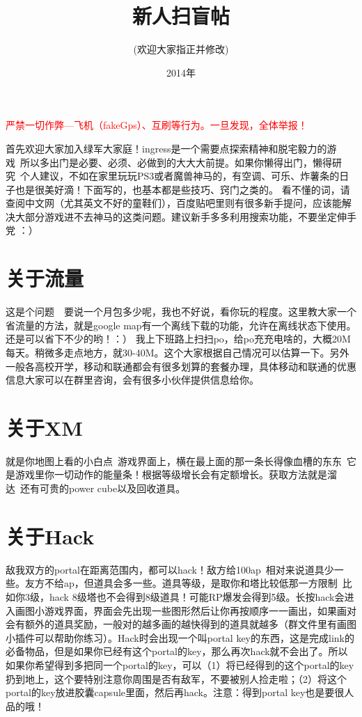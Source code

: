 \documentclass[a4paper]{article}
\title{新人扫盲帖}
\author{(欢迎大家指正并修改)}
\date{2014年}
\begin{document}
\maketitle
\textcolor{red}{严禁一切作弊---飞机（fakeGps）、互刷等行为。一旦发现，全体举报！}
\tableofcontents

\newpage

首先欢迎大家加入绿军大家庭！ingress是一个需要点探索精神和脱宅毅力的游戏~所以多出门是必要、必须、必做到的大大大前提。如果你懒得出门，懒得研究~个人建议，不如在家里玩玩PS3或者魔兽神马的，有空调、可乐、炸薯条的日子也是很美好滴！下面写的，也基本都是些技巧、窍门之类的。 看不懂的词，请查阅中文网（尤其英文不好的童鞋们），百度贴吧里则有很多新手提问，应该能解决大部分游戏进不去神马的这类问题。建议新手多多利用搜索功能，不要坐定伸手党 ：）

\section{关于流量}
这是个问题~~要说一个月包多少呢，我也不好说，看你玩的程度。这里教大家一个省流量的方法，就是google map有一个离线下载的功能，允许在离线状态下使用。还是可以省下不少的哟！：） 我上下班路上扫扫po，给po充充电啥的，大概20M每天。稍微多走点地方，就30-40M。这个大家根据自己情况可以估算一下。另外一般各高校开学，移动和联通都会有很多划算的套餐办理，具体移动和联通的优惠信息大家可以在群里咨询，会有很多小伙伴提供信息给你。

\section{关于XM}
就是你地图上看的小白点~游戏界面上，横在最上面的那一条长得像血槽的东东~它是游戏里你一切动作的能量条！根据等级增长会有定额增长。获取方法就是溜达~还有可贵的power cube以及回收道具。

\section{关于Hack}
敌我双方的portal在距离范围内，都可以hack！敌方给100ap~相对来说道具少一些。友方不给ap，但道具会多一些。道具等级，是取你和塔比较低那一方限制~比如你3级，hack 8级塔也不会得到8级道具！可能RP爆发会得到5级。长按hack会进入画图小游戏界面，界面会先出现一些图形然后让你再按顺序一一画出，如果画对会有额外的道具奖励，一般对的越多画的越快得到的道具就越多（群文件里有画图小插件可以帮助你练习）。Hack时会出现一个叫portal key的东西，这是完成link的必备物品，但是如果你已经有这个portal的key，那么再次hack就不会出了。所以如果你希望得到多把同一个portal的key，可以（1）将已经得到的这个portal的key扔到地上，这个要特别注意你周围是否有敌军，不要被别人捡走啦；（2）将这个portal的key放进胶囊capsule里面，然后再hack。注意：得到portal key也是要很人品的哦！
\end{document}
